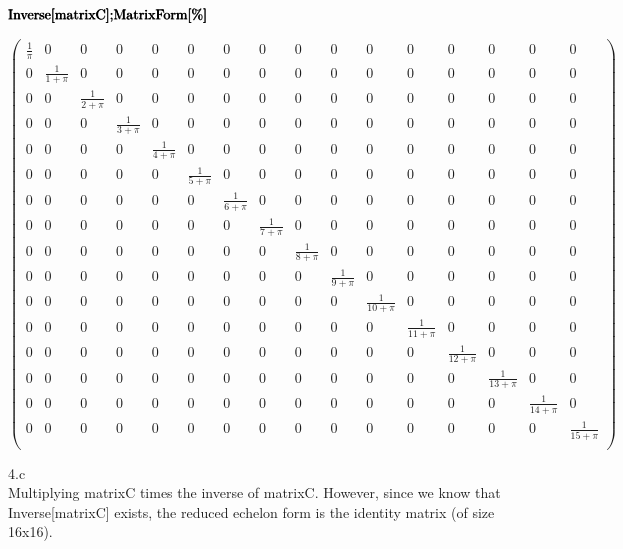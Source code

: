 \documentclass[11pt,a4paper]{article}
\begin{document}
\begin{doublespace}
\noindent\(\pmb{\text{Inverse}[\text{matrixC}];}\\
\pmb{\text{MatrixForm}[\%]}\)
\end{doublespace}

\begin{doublespace}
\noindent\(\left(
\begin{array}{cccccccccccccccc}
 \frac{1}{\pi } & 0 & 0 & 0 & 0 & 0 & 0 & 0 & 0 & 0 & 0 & 0 & 0 & 0 & 0 & 0 \\
 0 & \frac{1}{1+\pi } & 0 & 0 & 0 & 0 & 0 & 0 & 0 & 0 & 0 & 0 & 0 & 0 & 0 & 0 \\
 0 & 0 & \frac{1}{2+\pi } & 0 & 0 & 0 & 0 & 0 & 0 & 0 & 0 & 0 & 0 & 0 & 0 & 0 \\
 0 & 0 & 0 & \frac{1}{3+\pi } & 0 & 0 & 0 & 0 & 0 & 0 & 0 & 0 & 0 & 0 & 0 & 0 \\
 0 & 0 & 0 & 0 & \frac{1}{4+\pi } & 0 & 0 & 0 & 0 & 0 & 0 & 0 & 0 & 0 & 0 & 0 \\
 0 & 0 & 0 & 0 & 0 & \frac{1}{5+\pi } & 0 & 0 & 0 & 0 & 0 & 0 & 0 & 0 & 0 & 0 \\
 0 & 0 & 0 & 0 & 0 & 0 & \frac{1}{6+\pi } & 0 & 0 & 0 & 0 & 0 & 0 & 0 & 0 & 0 \\
 0 & 0 & 0 & 0 & 0 & 0 & 0 & \frac{1}{7+\pi } & 0 & 0 & 0 & 0 & 0 & 0 & 0 & 0 \\
 0 & 0 & 0 & 0 & 0 & 0 & 0 & 0 & \frac{1}{8+\pi } & 0 & 0 & 0 & 0 & 0 & 0 & 0 \\
 0 & 0 & 0 & 0 & 0 & 0 & 0 & 0 & 0 & \frac{1}{9+\pi } & 0 & 0 & 0 & 0 & 0 & 0 \\
 0 & 0 & 0 & 0 & 0 & 0 & 0 & 0 & 0 & 0 & \frac{1}{10+\pi } & 0 & 0 & 0 & 0 & 0 \\
 0 & 0 & 0 & 0 & 0 & 0 & 0 & 0 & 0 & 0 & 0 & \frac{1}{11+\pi } & 0 & 0 & 0 & 0 \\
 0 & 0 & 0 & 0 & 0 & 0 & 0 & 0 & 0 & 0 & 0 & 0 & \frac{1}{12+\pi } & 0 & 0 & 0 \\
 0 & 0 & 0 & 0 & 0 & 0 & 0 & 0 & 0 & 0 & 0 & 0 & 0 & \frac{1}{13+\pi } & 0 & 0 \\
 0 & 0 & 0 & 0 & 0 & 0 & 0 & 0 & 0 & 0 & 0 & 0 & 0 & 0 & \frac{1}{14+\pi } & 0 \\
 0 & 0 & 0 & 0 & 0 & 0 & 0 & 0 & 0 & 0 & 0 & 0 & 0 & 0 & 0 & \frac{1}{15+\pi } \\
\end{array}
\right)\)
\end{doublespace}

4.c\\
Multiplying matrixC times the inverse of matrixC. However, since we know that Inverse[matrixC] exists, the reduced echelon form is the identity matrix
(of size 16x16).
\end{document}

